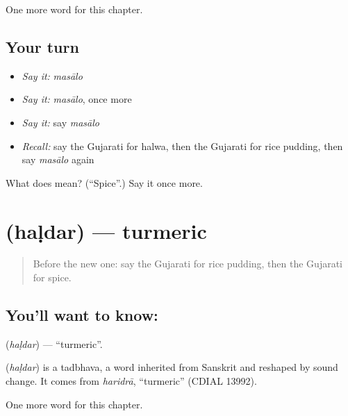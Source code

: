 \begin{grammarlens}[title={What you've built}]
One more word for this chapter.
\end{grammarlens}

\subsection*{Your turn}
\begin{itemize}
\raggedright
  \item \emph{Say it:} \emph{masālo}
  \item \emph{Say it:} \emph{masālo}, once more
  \item \emph{Say it:} say \emph{masālo}
  \item \emph{Recall:} say the Gujarati for halwa, then the Gujarati for rice pudding, then say \emph{masālo} again
\end{itemize}

\begin{tcolorbox}[breakable,colback=teal!4,colframe=teal!35!black,title={Before you move on}]
What does  mean? (\textquotedblleft{}Spice\textquotedblright{}.) Say it once more.
\end{tcolorbox}
\section[\texorpdfstring{\gu{હળદર} (haḷdar)}{હળદર (haḷdar)}]{ (haḷdar) — turmeric}

\label{lesson:GU-C118-haldar}



\begin{quote}
Before the new one: say the Gujarati for rice pudding, then the Gujarati for spice.
\end{quote}

\subsection*{You'll want to know: }
\textbf{} (\emph{haḷdar}) — \textquotedblleft{}turmeric\textquotedblright{}.

\begin{cousinweb}
\textbf{} (\emph{haḷdar}) is a tadbhava, a word inherited from Sanskrit and reshaped by sound change. It comes from \emph{haridrā}, \textquotedblleft{}turmeric\textquotedblright{} (CDIAL 13992).
\end{cousinweb}

\begin{grammarlens}[title={What you've built}]
One more word for this chapter.
\end{grammarlens}

